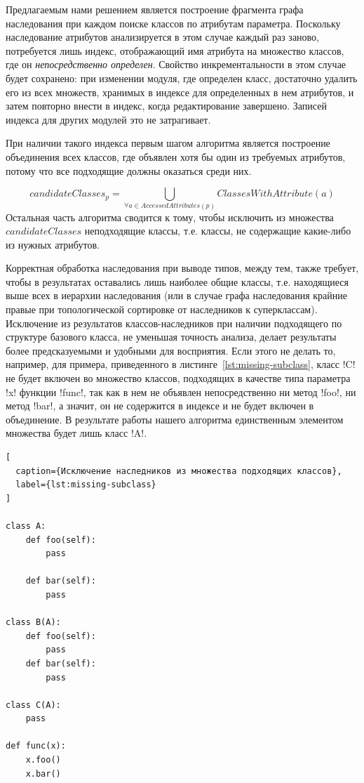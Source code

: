 Предлагаемым нами решением является построение фрагмента графа наследования при
каждом поиске классов по атрибутам параметра. Поскольку наследование атрибутов
анализируется в этом случае каждый раз заново, потребуется лишь индекс,
отображающий имя атрибута на множество классов, где он \emph{непосредственно
  определен}.  Свойство инкрементальности в этом случае будет сохранено: при
изменении модуля, где определен класс, достаточно удалить его из всех множеств,
хранимых в индексе для определенных в нем атрибутов, и затем повторно внести в
индекс, когда редактирование завершено. Записей индекса для других модулей это
не затрагивает.

При наличии такого индекса первым шагом алгоритма является построение
объединения всех классов, где объявлен хотя бы один из требуемых атрибутов,
потому что все подходящие должны оказаться среди них.

\[
  candidateClasses_p = \bigcup\limits_{\forall{a} \in AccessedAttributes(p)}
  ClassesWithAttribute(a)
\]
Остальная часть алгоритма сводится к тому, чтобы исключить из множества
$candidateClasses$ неподходящие классы, т.е. классы, не содержащие какие-либо из
нужных атрибутов. 

Корректная обработка наследования при выводе типов, между тем, также требует,
чтобы в результатах оставались лишь наиболее общие классы, т.е. находящиеся выше
всех в иерархии наследования (или в случае графа наследования крайние правые при
топологической сортировке от наследников к суперклассам). Исключение из
результатов классов-наследников при наличии подходящего по структуре базового
класса, не уменьшая точность анализа, делает результаты более предсказуемыми и
удобными для восприятия. Если этого не делать то, например, для
примера, приведенного в листинге~\ref{lst:missing-subclass}, класс !C! не будет
включен во множество классов, подходящих в качестве типа параметра !x! функции
!func!, так как в нем не объявлен непосредственно ни метод !foo!, ни метод
!bar!, а значит, он не содержится в индексе и не будет включен в объединение. В
результате работы нашего алгоритма единственным элементом множества будет лишь
класс !A!.

\begin{lstlisting}[
  caption={Исключение наследников из множества подходящих классов},
  label={lst:missing-subclass}
]

class A:
    def foo(self):
        pass

    def bar(self):
        pass

class B(A):
    def foo(self):
        pass
    def bar(self):
        pass

class C(A):
    pass

def func(x):
    x.foo()
    x.bar()
    
\end{lstlisting}


